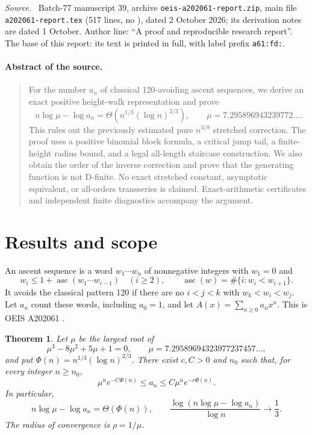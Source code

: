 \documentclass[11pt,letterpaper]{article}
\numberwithin{equation}{section}
\newtheorem{theorem}{Theorem}[section]
\theoremstyle{remark}\newtheorem{remark}[theorem]{Remark}
\newcommand{\asc}{\operatorname{asc}}
\newenvironment{partsource}{\par\medskip\noindent\begin{minipage}{\linewidth}\small\raggedright\textit{Source.}\ }{\end{minipage}\par\medskip}
\begin{document}
\begin{partsource}
Batch-77 manuscript 39, archive \texttt{oeis-a202061-report.zip}, main file \texttt{a202061-report.tex} (517 lines, no \verb||), dated 2 October 2026; its derivation notes are dated 1 October. Author line: ``A proof and reproducible research report''. The base of this report: its text is printed in full, with label prefix \texttt{a61:fd:}.
\end{partsource}

\paragraph{Abstract of the source.}
\begin{quote}\small
For the number $a_n$ of classical 120-avoiding ascent sequences, we derive an exact positive height-walk representation and prove
\[
 n\log\mu-\log a_n=\Theta\!\left(n^{1/3}(\log n)^{2/3}\right),
 \qquad \mu=7.295896943239772\ldots.
\]
This rules out the previously estimated pure $n^{3/8}$ stretched correction. The proof uses a positive binomial block formula, a critical jump tail, a finite-height radius bound, and a legal all-length staircase construction. We also obtain the order of the inverse correction and prove that the generating function is not D-finite. No exact stretched constant, asymptotic equivalent, or all-orders transseries is claimed. Exact-arithmetic certificates and independent finite diagnostics accompany the argument.
\end{quote}

\section{Results and scope}
An ascent sequence is a word $w_1\cdots w_n$ of nonnegative integers with $w_1=0$ and
\[
 w_i\le1+\asc(w_1\cdots w_{i-1})\quad(i\ge2),\qquad
 \asc(w)=\#\{i:w_i<w_{i+1}\}.
\]
It avoids the classical pattern 120 if there are no $i<j<k$ with $w_k<w_i<w_j$. Let $a_n$ count these words, including $a_0=1$, and let $A(x)=\sum_{n\ge0}a_nx^n$. This is OEIS A202061 \cite{OEIS}.

\begin{theorem}\label{a61:fd:thm:main}
Let $\mu$ be the largest root of
\[
 \mu^3-8\mu^2+5\mu+1=0,
 \qquad \mu=7.29589694323977237457\ldots,
\]
and put $\Phi(n)=n^{1/3}(\log n)^{2/3}$. There exist $c,C>0$ and $n_0$ such that, for every integer $n\ge n_0$,
\begin{equation}\label{a61:fd:eq:main}
 \mu^n e^{-C\Phi(n)}\le a_n\le C\mu^n e^{-c\Phi(n)}.
\end{equation}
In particular,
\[
 n\log\mu-\log a_n=\Theta(\Phi(n)),\qquad
 \frac{\log(n\log\mu-\log a_n)}{\log n}\longrightarrow\frac13.
\]
The radius of convergence is $\rho=1/\mu$.
\end{theorem}
\end{document}
